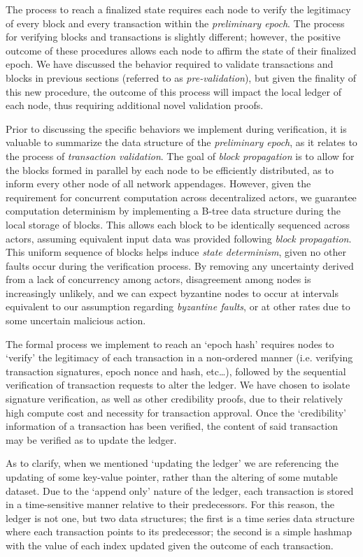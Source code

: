 The process to reach a finalized state requires each node to verify the legitimacy of every block and every transaction within the \textit{preliminary epoch}. The process for verifying blocks and transactions is slightly different; however, the positive outcome of these procedures allows each node to affirm the state of their finalized epoch. We have discussed the behavior required to validate transactions and blocks in previous sections (referred to as \textit{pre-validation}), but given the finality of this new procedure, the outcome of this process will impact the local ledger of each node, thus requiring additional novel validation proofs.

Prior to discussing the specific behaviors we implement during verification, it is valuable to summarize the data structure of the \textit{preliminary epoch}, as it relates to the process of \textit{transaction validation}. The goal of \textit{block propagation} is to allow for the blocks formed in parallel by each node to be efficiently distributed, as to inform every other node of all network appendages. However, given the requirement for concurrent computation across decentralized actors, we guarantee computation determinism by implementing a B-tree data structure during the local storage of blocks. This allows each block to be identically sequenced across actors, assuming equivalent input data was provided following \textit{block propagation}. This uniform sequence of blocks helps induce \textit{state determinism}, given no other faults occur during the verification process. By removing any uncertainty derived from a lack of concurrency among actors, disagreement among nodes is increasingly unlikely, and we can expect byzantine nodes to occur at intervals equivalent to our assumption regarding \textit{byzantine faults}, or at other rates due to some uncertain malicious action.

The formal process we implement to reach an ‘epoch hash’ requires nodes to ‘verify’ the legitimacy of each transaction in a non-ordered manner (i.e. verifying transaction signatures, epoch nonce and hash, etc…), followed by the sequential verification of transaction requests to alter the ledger. We have chosen to isolate signature verification, as well as other credibility proofs, due to their relatively high compute cost and necessity for transaction approval. Once the ‘credibility’ information of a transaction has been verified, the content of said transaction may be verified as to update the ledger.

As to clarify, when we mentioned ‘updating the ledger’ we are referencing the updating of some key-value pointer, rather than the altering of some mutable dataset. Due to the ‘append only’ nature of the ledger, each transaction is stored in a time-sensitive manner relative to their predecessors. For this reason, the ledger is not one, but two data structures; the first is a time series data structure where each transaction points to its predecessor; the second is a simple hashmap with the value of each index updated given the outcome of each transaction. 

